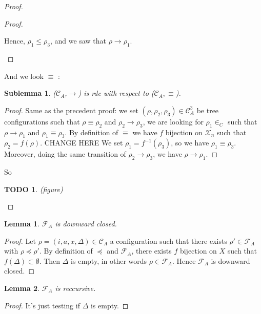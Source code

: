 \documentclass[a4paper,10pt]{report}
\newtheorem{lm}{Lemma}[thr]
\newtheorem{slm}{Sublemma}[lm]
\newtheorem{td}{TODO}
\newcommand{\C}{\mathcal{C}_{A}}
\newcommand{\F}{\mathcal{F}_{A}}
\newcommand{\X}{\mathcal{X}_{n}}
\begin{document}
\begin{proof}
\begin{proof}
\begin{itemize}
     Hence, $\rho_1 \leq \rho_3$, and we saw that $\rho \rightarrow \rho_1$.
   \end{itemize}   
  \end{proof}
  And we look $\equiv$ :
  \begin{slm}
    ($\C$,$\rightarrow$) is rdc with respect to ($\C,\equiv$).
  \end{slm}
  \begin{proof}
    Same as the precedent proof: we set $(\rho, \rho_2  , \rho_3) \in \C^3 $ be tree configurations 
   such that $\rho \equiv \rho_2$ and $\rho_2 \rightarrow \rho_3$, we are looking for $\rho_1 \in _C$ such that $\rho \rightarrow \rho_1$  and $\rho_1 \equiv \rho_3$.
   By definition of $\equiv$ we have $f$ bijection on $\X$ such that $\rho_2 = f(\rho)$. CHANGE HERE We set $\rho_1 = f^{-1}(\rho_3)$, so we have $\rho_1 \equiv \rho_3$.
   Moreover, doing the same transition of $\rho_2 \rightarrow \rho_3$, we have $\rho \rightarrow \rho_1$.    
  \end{proof}
   So 
   \begin{td}
      (figure)
  
   \end{td}

  
\end{proof}


\begin{lm} \label{cd5}
  $\F$ is downward closed. 
\end{lm}
\begin{proof}
  Let $\rho=(i,a,x,\Delta) \in \C$ a configuration such that there exists $\rho' \in \F$ with $\rho \preceq \rho'$.
  By definition of $\preceq$ and $\F$, there exists $f$ bijection on $X$ such that $f(\Delta) \subset \emptyset$.
  Then $\Delta$ is empty, in other words $\rho \in \F$.
  Hence $\F$ is downward closed. 
\end{proof}

\begin{lm} \label{cd6}
  $\F$ is reccursive.
\end{lm}

\begin{proof}
  It's just testing if $\Delta$ is empty.
\end{proof}
\end{document}
